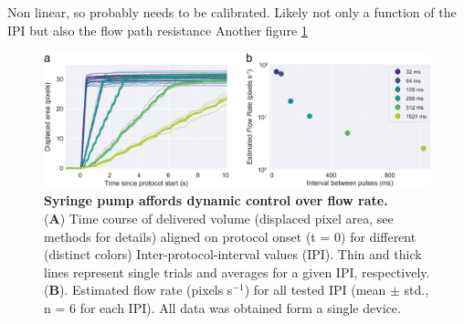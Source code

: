 Non linear, so probably needs to be calibrated. Likely not only a function of the IPI but also the flow path resistance
Another figure \ref{fig:FlowRateControl}
\begin{figure}
	\centering
	\includegraphics[width=1.0\linewidth]{Figures/Artboard 3.pdf}
	\caption{\textbf{Syringe pump affords dynamic control over flow rate.}\\
		  (\textbf{A}) Time course of delivered volume (displaced pixel area, see methods for details) aligned on protocol onset (t = 0) for different (distinct colors) Inter-protocol-interval values (IPI). Thin and thick lines represent single trials and averages for a given IPI, respectively. (\textbf{B}). Estimated flow rate (pixels s$^{-1}$) for all tested IPI (mean $\pm$ std., n = 6 for each IPI). All data was obtained form a single device.}
	\label{fig:FlowRateControl} 
\end{figure}

